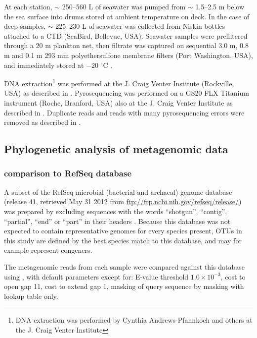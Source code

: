 

At each station, $\sim$ 250--560 L of seawater was pumped from $\sim$ 1.5--2.5 m below the sea surface into drums stored at ambient temperature on deck. 
In the case of deep samples, $\sim$ 225--230 L of seawater was collected from Niskin bottles attached to a \ac{CTD} (SeaBird, Bellevue, USA).
Seawater samples were prefiltered through a 20 \textmu{}m plankton net, then filtrate was captured on sequential 3.0 \textmu{}m, 0.8 \textmu{}m and 0.1 \textmu{}m 293 mm polyethersulfone membrane filters (Port Washington, USA), and immediately stored at $-20$ $^\circ$C \cite{Rusch:2007ez,Ng:2010cd}.

DNA extraction\footnote{DNA extraction was performed by Cynthia Andrews-Pfannkoch and others at the J. Craig Venter Institute} was performed at the J. Craig Venter Institute (Rockville, USA) as described in \citet{Rusch:2007ez}.
Pyrosequencing was performed on a GS20 FLX Titanium instrument (Roche, Branford, USA) also at the J. Craig Venter Institute as described in \citet{Lauro:2010jna}.
Duplicate reads and reads with many pyrosequencing errors were removed as described in \citet{Lauro:2010jna}.

\subsection{Phylogenetic analysis of metagenomic data}

\subsubsection{ comparison to RefSeq database}

A subset of the RefSeq microbial (bacterial and archaeal) genome database (release 41, retrieved May 31 2012 from \url{ftp://ftp.ncbi.nih.gov/refseq/release/}) was prepared by excluding sequences with the words ``shotgun'', ``contig'', ``partial'', ``end'' or ``part'' in their headers \cite{Angly:2009ip}.
Because this database was not expected to contain representative genomes for every species present, \acp{OTU} in this study are defined by the best species match to this database, and may for example represent congeners.

The metagenomic reads from each sample were compared against this database using , with default parameters except for: E-value threshold $1.0\times{}10^{-3}$, cost to open gap 11, cost to extend gap 1, masking of query sequence by  masking with lookup table only.

